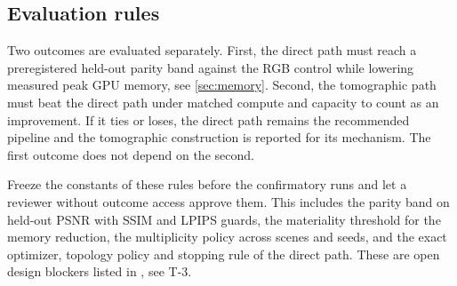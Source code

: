 \subsection{Evaluation rules}
\label{sec:rules}

Two outcomes are evaluated separately.  First, the direct path must reach a preregistered
held-out parity band against the RGB control while lowering measured peak GPU memory, see
\cref{sec:memory}.  Second, the tomographic path must beat the direct path under matched
compute and capacity to count as an improvement.  If it ties or loses, the direct path
remains the recommended pipeline and the tomographic construction is reported for its
mechanism.  The first outcome does not depend on the second.

\begin{TodoBlock}
Freeze the constants of these rules before the confirmatory runs and let a reviewer
without outcome access approve them.  This includes the parity band on held-out PSNR with
SSIM and LPIPS guards, the materiality threshold for the memory reduction, the
multiplicity policy across scenes and seeds, and the exact optimizer, topology policy and
stopping rule of the direct path.  These are open design blockers listed in
, see T-3.
\end{TodoBlock}
